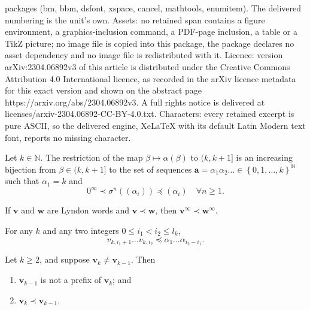 \documentclass[10pt,a4paper]{amsart}
\newcommand{\N}{\ensuremath{\mathbb{N}}}
\newcommand{\al}{\alpha}
\newcommand{\f}{\infty}
\newcommand{\lle}{\preccurlyeq}
\newcommand{\set}[1]{\left\{#1\right\}}
\newcommand{\si}{\sigma}
\newcommand{\w}{\mathbf{w}}
\renewcommand{\a}{ {\mathbf{a}}}
\renewcommand{\v}{\mathbf{v}}
\begin{document}
packages (bm, bbm, dsfont, xspace, cancel, mathtools, enumitem). The delivered numbering is the unit's own. Assets: no retained span contains a figure environment, a graphics-inclusion command, a PDF-page inclusion, a table or a TikZ picture; no image file is copied into this package, the package declares no asset dependency and no image file is redistributed with it. Licence: version arXiv:2304.06892v3 of this article is distributed under the Creative Commons Attribution 4.0 International licence, as recorded in the arXiv licence metadata for this exact version and shown on the abstract page https://arxiv.org/abs/2304.06892v3. A full rights notice is delivered at licenses/arxiv-2304.06892-CC-BY-4.0.txt. Characters: every retained excerpt is pure ASCII, so the delivered engine, XeLaTeX with its default Latin Modern text font, reports no missing character.
\begin{lemma} \label{lem:quasi-greedy expansion-alpha-q}
{Let $k\in\N$. The restriction of the map $\beta\mapsto\al(\beta)$ to $(k,k+1]$ is an increasing bijection from $\beta\in (k,k+1]$ to the set of sequences $\a=\al_1\al_2\dots\in\set{0,1,\dots,k}^\N$ such that $\al_1=k$ and}
\[
0^\f\prec\si^n((\al_i))\lle (\al_i)\quad\forall n\ge 1.
\]
\end{lemma}

\begin{lemma} \label{lem:repeating-preserves-order}
If $\v$ and $\w$ are Lyndon words and $\v\prec\w$, then $\v^\f\prec \w^\f$.
\end{lemma}

\begin{lemma} \label{lem:always-below-alpha}
For any $k$ and any two integers $0\leq i_1<i_2\leq l_k$,
\begin{equation} \label{eq:always-below-alpha}
v_{k,i_1+1}\dots v_{k,i_2}\lle \al_1\dots\al_{i_2-i_1}.
\end{equation}
\end{lemma}

\begin{lemma} \label{lem:v_k-decreasing}
Let $k\geq 2$, and suppose $\v_{k}\neq \v_{k-1}$. Then
\begin{enumerate}[{\rm(i)}]
\item $\v_{k-1}$ is not a prefix of $\v_{k}$; and
\item $\v_k \prec \v_{k-1}$.
\end{enumerate}
\end{lemma}
\end{document}
